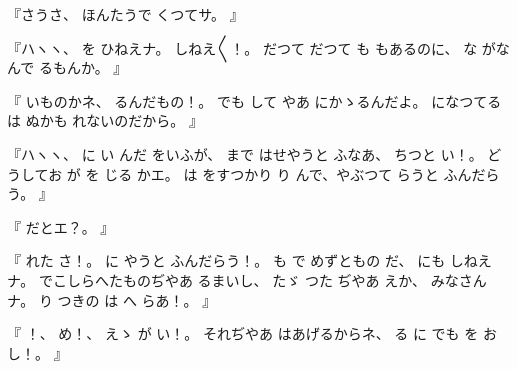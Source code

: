 %
『さうさ、
%
ほんたうで
くつてサ。
』

%
『ハヽヽ、
%
を
ひねえナ。
%
しねえ〳〵！。
%
だつて
だつて
も
もあるのに、
%
な
がなんで
るもんか。
』

%
『
いものかネ、
%
るんだもの！。
%
でも
して
やあ
にかゝるんだよ。
%
になつてる
は
ぬかも
れないのだから。
』

%
『ハヽヽ、
%
に
い
んだ
をいふが、
%
まで
はせやうと
ふなあ、
%
ちつと
い！。
%
どうしてお
が
を
じる
かエ。
%
は
をすつかり
り
んで、やぶつて
らうと
ふんだらう。
』

%
『
だとエ？。
』

%
『
れた
さ！。
%
に
やうと
ふんだらう！。
%
も
で
めずともの
だ、
%
にも
しねえナ。
%
でこしらへたものぢやあ
るまいし、
%
たゞ
つた
ぢやあ
えか、
%
みなさんナ。
%
り
つきの
は
へ
らあ！。
』

%
『
！、
%
め！、
%
えゝ
が
い！。
%
それぢやあ
はあげるからネ、
%
る
に
でも
を
お
し！。
』
